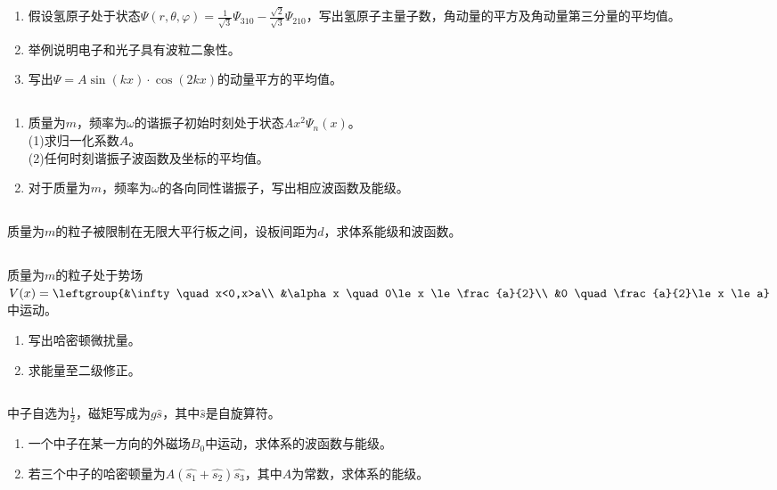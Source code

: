
\subsection{ }
\begin{enumerate}
\item 假设氢原子处于状态$\Psi (r,\theta,\varphi)=\frac{1}{\sqrt{3}}\Psi_{310}-\frac{\sqrt{2}}{\sqrt{3}}\Psi_{210}$，写出氢原子主量子数，角动量的平方及角动量第三分量的平均值。
\item 举例说明电子和光子具有波粒二象性。
\item 写出$\Psi = A \sin(kx)\cdot\cos(2kx)$的动量平方的平均值。
\end{enumerate}
\subsection{ }
\begin{enumerate}
\item 质量为$m$，频率为$\omega$的谐振子初始时刻处于状态$Ax^2\Psi_n(x)$。\\
(1)求归一化系数$A$。\\
(2)任何时刻谐振子波函数及坐标的平均值。
\item 对于质量为$m$，频率为$\omega$的各向同性谐振子，写出相应波函数及能级。
\end{enumerate}
\subsection{ }
质量为$m$的粒子被限制在无限大平行板之间，设板间距为$d$，求体系能级和波函数。
\subsection{ }
质量为$m$的粒子处于势场$V(x)=\leftgroup{&\infty \quad x<0,x>a\\ &\alpha x \quad 0\le x \le \frac{a}{2}\\ &0 \quad \frac{a}{2}\le x \le a} $中运动。
\begin{enumerate}
\item 写出哈密顿微扰量。
\item 求能量至二级修正。
\end{enumerate}
\subsection{ }
中子自选为$\frac{1}{2}$，磁矩写成为$g\hat{s}$，其中$\hat{s}$是自旋算符。
\begin{enumerate}
\item 一个中子在某一方向的外磁场$B_0$中运动，求体系的波函数与能级。
\item 若三个中子的哈密顿量为$A(\hat{s_1}+\hat{s_2})\hat{s_3} $，其中$A$为常数，求体系的能级。
\end{enumerate}